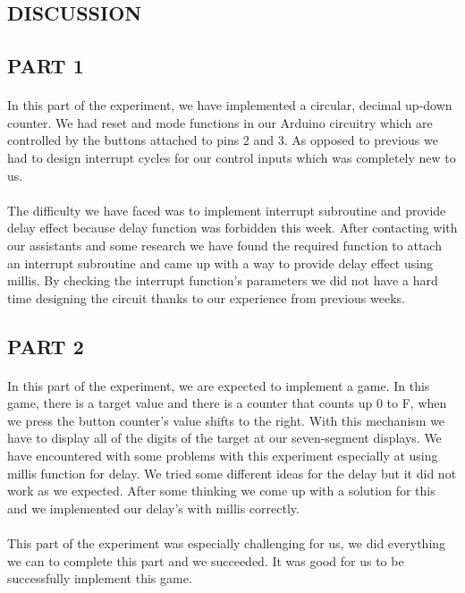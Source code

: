 \documentclass[pdftex,12pt,a4paper]{article}
\begin{document}
\begin{flushleft}
\newpage
\section{DISCUSSION}
\subsection{PART 1}
\paragraph{}
In this part of the experiment, we have implemented a circular, decimal up-down counter. We had reset and mode functions in our Arduino circuitry which are controlled by the buttons attached to pins 2 and 3. As opposed to previous we had to design interrupt cycles for our control inputs which was completely new to us.
\paragraph{}
The difficulty we have faced was to implement interrupt subroutine and provide delay effect because delay function was forbidden this week. After contacting with our assistants and some research we have found the required function to attach an interrupt subroutine and came up with a way to provide delay effect using millis. By checking the interrupt function's parameters we did not have a hard time designing the circuit thanks to our experience from previous weeks. 
\subsection{PART 2} 

\paragraph{}
In this part of the experiment, we are expected to implement a game. In this game, there is a target value and there is a counter that counts up 0 to F, when we press the button counter's value shifts to the right. With this mechanism we have to display all of the digits of the target at our seven-segment displays. We have encountered with some problems with this experiment especially at using millis function for delay. We tried some different ideas for the delay but it did not work as we expected. After some thinking we come up with a solution for this and we implemented our delay's with millis correctly.
\paragraph{}
This part of the experiment was especially challenging for us, we did everything we can to complete this part and we succeeded. It was good for us to be successfully implement this game. 




\end{flushleft}
\end{document}
